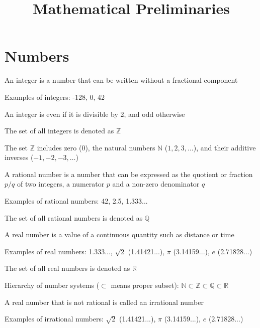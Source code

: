 \documentclass[8pt,a4paper,compress]{beamer}
\title{Mathematical Preliminaries}
\date{}
\begin{document}
\begin{frame}
\vfill
\titlepage
\end{frame}

\section{Numbers}
\begin{frame}[fragile]
\pause

An integer is a number that can be written without a fractional component

\pause\bigskip

Examples of integers: -128, 0, 42

\pause\bigskip

An integer is even if it is divisible by 2, and odd otherwise

\pause\bigskip

The set of all integers is denoted as $\mathbb{Z}$

\pause\bigskip

The set $\mathbb{Z}$ includes zero (0), the natural numbers $\mathbb{N}$ ($1, 2, 3, \dots$), and their additive inverses ($-1, -2, -3, \dots$)
\end{frame}

\begin{frame}[fragile]
\pause

A rational number is a number that can be expressed as the quotient or fraction $p/q$ of two integers, a numerator $p$ and a non-zero denominator $q$

\pause\bigskip

Examples of rational numbers: 42, 2.5, 1.333...

\pause\bigskip

The set of all rational numbers is denoted as $\mathbb{Q}$
\end{frame}

\begin{frame}[fragile]
\pause

A real number is a value of a continuous quantity such as distance or time

\pause\bigskip

Examples of real numbers: 1.333..., $\sqrt{2}$ (1.41421...), $\pi$ (3.14159...), $e$ (2.71828...)

\pause\bigskip

The set of all real numbers is denoted as $\mathbb{R}$

\pause\bigskip

Hierarchy of number systems ($\subset$ means proper subset): $\mathbb{N} \subset \mathbb{Z} \subset \mathbb{Q} \subset \mathbb{R}$

\pause\bigskip

A real number that is not rational is called an irrational number

\pause\bigskip

Examples of irrational numbers: $\sqrt{2}$ (1.41421...), $\pi$ (3.14159...), $e$ (2.71828...)
\end{frame}
\end{document}
